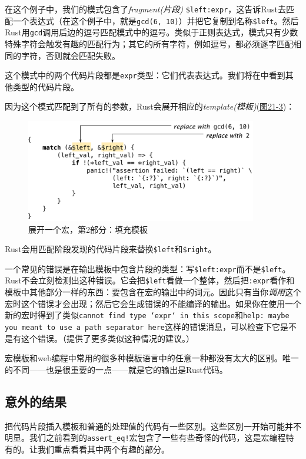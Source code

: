 在这个例子中，我们的模式包含了\emph{fragment(片段)} \texttt{\$left:expr}，这告诉Rust去匹配一个表达式（在这个例子中，就是\texttt{gcd(6, 10)}）并把它复制到名称\texttt{\$left}。然后Rust用\texttt{gcd}调用后边的逗号匹配模式中的逗号。类似于正则表达式，模式只有少数特殊字符会触发有趣的匹配行为；其它的所有字符，例如逗号，都必须逐字匹配相同的字符，否则就会匹配失败。

这个模式中的两个代码片段都是\texttt{expr}类型：它们代表表达式。我们将在中看到其他类型的代码片段。

因为这个模式匹配到了所有的参数，Rust会展开相应的\emph{template(模板)}(\hyperref[f21-3]{图21-3})：
\begin{figure}[htbp]
    \centering
    \includegraphics[width=0.9\textwidth]{../img/f21-3.png}
    \caption{展开一个宏，第2部分：填充模板}
    \label{f21-3}
\end{figure}

Rust会用匹配阶段发现的代码片段来替换\texttt{\$left}和\texttt{\$right}。

一个常见的错误是在输出模板中包含片段的类型：写\texttt{\$left:expr}而不是\texttt{\$left}。Rust不会立刻检测出这种错误。它会把\texttt{\$left}看做一个整体，然后把\texttt{:expr}看作和模板中其他部分一样的东西：要包含在宏的输出中的词元。因此只有当你\emph{调用}这个宏时这个错误才会出现；然后它会生成错误的不能编译的输出。如果你在使用一个新的宏时得到了类似\texttt{cannot find type `expr` in this scope}和\texttt{help: maybe you meant to use a path separator here}这样的错误消息，可以检查下它是不是有这个错误。（提供了更多类似这种情况的建议。）

宏模板和web编程中常用的很多种模板语言中的任意一种都没有太大的区别。唯一的不同——也是很重要的一点——就是它的输出是Rust代码。

\subsection{意外的结果}
把代码片段插入模板和普通的处理值的代码有一些区别。这些区别一开始可能并不明显。我们之前看到的\texttt{assert\_eq!}宏包含了一些有些奇怪的代码，这是宏编程特有的。让我们重点看看其中两个有趣的部分。

